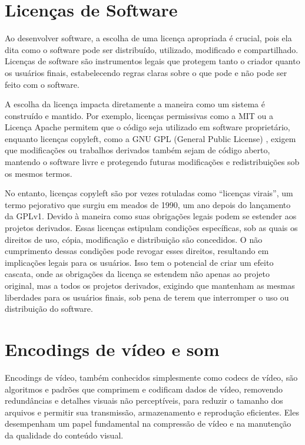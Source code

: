 \documentclass[12pt, %
openright, 
oneside, %
a4paper,    %
brazil]{facom-ufu-abntex2}
\begin{document}
\section{Licenças de Software}

Ao desenvolver software, a escolha de uma licença apropriada é crucial, pois
ela dita como o software pode ser distribuído, utilizado, modificado e
compartilhado. Licenças de software são instrumentos legais que protegem tanto
o criador quanto os usuários finais, estabelecendo regras claras sobre o que
pode e não pode ser feito com o software.

A escolha da licença impacta diretamente a maneira como um sistema é construído
e mantido. Por exemplo, licenças permissivas como a MIT
\cite{OpenSourceInitiative} ou a Licença Apache \cite{ApacheLicense2004}
permitem que o código seja utilizado em software proprietário, enquanto
licenças copyleft, como a GNU GPL (General Public License) \cite{gnu_gpl},
exigem que modificações ou trabalhos derivados também sejam de código aberto,
mantendo o software livre e protegendo futuras modificações e redistribuições
sob os mesmos termos.

No entanto, licenças copyleft são por vezes rotuladas como ``licenças virais'',
um termo pejorativo que surgiu em meados de 1990, um ano depois do lançamento
da GPLv1. Devido à maneira como suas obrigações legais podem se estender aos
projetos derivados. Essas licenças estipulam condições específicas, sob as
quais os direitos de uso, cópia, modificação e distribuição são concedidos. O
não cumprimento dessas condições pode revogar esses direitos, resultando em
implicações legais para os usuários. Isso tem o potencial de criar um efeito
cascata, onde as obrigações da licença se estendem não apenas ao projeto
original, mas a todos os projetos derivados, exigindo que mantenham as mesmas
liberdades para os usuários finais, sob pena de terem que interromper o uso ou
distribuição do software. \cite{Golden2005}

\section{Encodings de vídeo e som}

Encodings de vídeo, também conhecidos simplesmente como codecs de vídeo, são
algoritmos e padrões que comprimem e codificam dados de vídeo, removendo
redundâncias e detalhes visuais não perceptíveis, para reduzir o tamanho dos
arquivos e permitir sua transmissão, armazenamento e reprodução eficientes.
Eles desempenham um papel fundamental na compressão de vídeo e na manutenção da
qualidade do conteúdo visual. \cite{CodecMerriamWebster2019}
\end{document}
